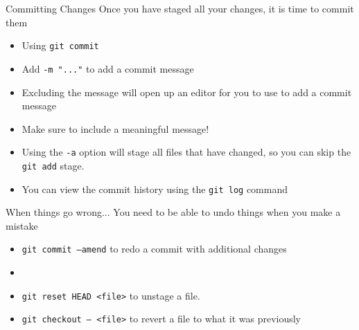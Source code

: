 \documentclass{beamer}
\begin{document}
\begin{frame}{Committing Changes}
    Once you have staged all your changes, it is time to commit them
    \begin{itemize}
        \item Using \texttt{git commit}
        \item Add \texttt{-m "..."} to add a commit message
        \item Excluding the message will open up an editor for you to use to add a commit message
        \item Make sure to include a meaningful message!
        \item Using the \texttt{-a} option will stage all files that have changed, so you can skip the \texttt{git add} stage.
        \item You can view the commit history using the \texttt{git log} command
    \end{itemize}
\end{frame}

\begin{frame}{When things go wrong...}
    You need to be able to undo things when you make a mistake
    \begin{itemize}
        \item \texttt{git commit --amend} to redo a commit with additional changes
        \item %
        \item \texttt{git reset HEAD <file>} to unstage a file.
        \item \texttt{git checkout -- <file>} to revert a file to what it was previously
    \end{itemize}
\end{frame}
\end{document}
